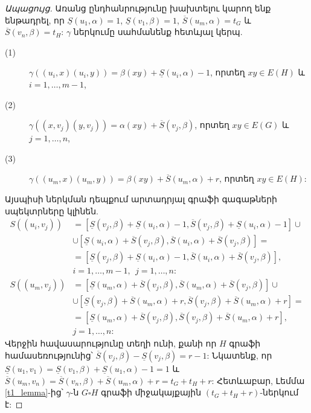 \begin{proof}[Ապացույց]
Առանց ընդհանրությունը խախտելու կարող ենք ենթադրել, որ $\underline{S}(u_1,\alpha)=1$, $\underline{S}(v_1,\beta)=1$, $\overline{S}(u_m,\alpha)=t_G$ և $\overline{S}(v_n,\beta)=t_H$: $\gamma$ ներկումը սահմանենք հետևյալ կերպ.
\begin{description}
\item[(1)] $\gamma\left((u_i,x)(u_i,y)\right) = \beta(xy) + \underline{S}(u_i,\alpha) - 1$, որտեղ $xy \in E(H)$ և $i=1,\ldots,m-1$,
\item[(2)] $\gamma\left((x,v_j)(y,v_j)\right) = \alpha(xy) + \overline{S}(v_j,\beta)$, որտեղ $xy \in E(G)$ և $j=1,\ldots,n$,
\item[(3)] $\gamma\left((u_m,x)(u_m,y)\right) = \beta(xy) + \overline{S}(u_m,\alpha) + r$, որտեղ $xy \in E(H)$:
\end{description}
Այսպիսի ներկման դեպքում արտադրյալ գրաֆի գագաթների սպեկտրները կլինեն.
\begin{align*}
S\left( (u_i,v_j) \right) &= \left[ \underline{S}(v_j,\beta) + \underline{S}(u_i,\alpha) - 1, \overline{S}(v_j,\beta) + \underline{S}(u_i,\alpha) - 1 \right] \cup \\
&\cup \left[ \underline{S}(u_i,\alpha) + \overline{S}(v_j,\beta), \overline{S}(u_i,\alpha) + \overline{S}(v_j,\beta) \right] = \\
&= \left[ \underline{S}(v_j,\beta) + \underline{S}(u_i,\alpha) - 1, \overline{S}(u_i,\alpha) + \overline{S}(v_j,\beta) \right],\\
&i=1,\ldots,m-1,\ \ j=1,\ldots,n:\\
S\left( (u_m,v_j) \right) &= \left[ \underline{S}(u_m,\alpha) + \overline{S}(v_j,\beta), \overline{S}(u_m,\alpha) + \overline{S}(v_j,\beta) \right] \cup \\
&\cup \left[ \underline{S}(v_j,\beta) + \overline{S}(u_m,\alpha) + r, \overline{S}(v_j,\beta) + \overline{S}(u_m,\alpha) + r \right] = \\
&= \left[ \underline{S}(u_m,\alpha) + \overline{S}(v_j,\beta) , \overline{S}(v_j,\beta) + \overline{S}(u_m,\alpha) + r \right],\\
&j=1,\ldots,n:
\end{align*}
Վերջին հավասարությունը տեղի ունի, քանի որ $H$ գրաֆի համասեռությունից՝ $\overline{S}(v_j,\beta) - \underline{S}(v_j,\beta) = r - 1$: Նկատենք, որ $\underline{S}(u_1,v_1)=\underline{S}(v_1,\beta)+\underline{S}(u_1,\alpha)-1=1$ և $\overline{S}(u_m,v_n)=\overline{S}(v_n,\beta)+\overline{S}(u_m,\alpha)+r=t_G+t_H+r$: Հետևաբար, Լեմմա \ref{t1_lemma}-ից՝ $\gamma$-ն $G \square H$ գրաֆի միջակայքային $(t_G+t_H+r)$-ներկում է:
\end{proof}

